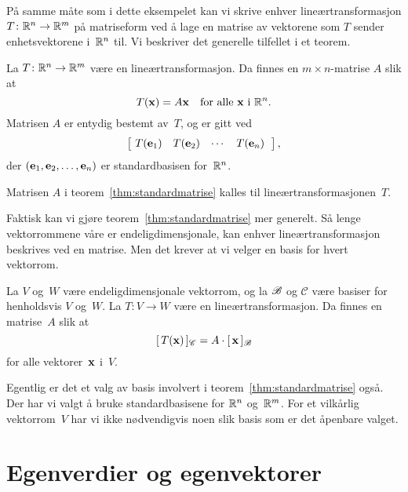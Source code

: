 På samme måte som i dette eksempelet kan vi skrive enhver
lineærtransformasjon $T \colon \mathbb{R}^n \to \mathbb{R}^m$ på matriseform ved å
lage en matrise av vektorene som $T$ sender enhetsvektorene i~$\mathbb{R}^n$
til.  Vi beskriver det generelle tilfellet i et teorem.

\begin{thm}
\label{thm:standardmatrise}
La $T \colon \mathbb{R}^n \to \mathbb{R}^m$ være en lineærtransformasjon.
Da finnes en $m \times n$-matrise $A$ slik at
\[
T(\mathbf{x}) = A\mathbf{x}
\quad\text{for alle $\mathbf{x}$ i $\mathbb{R}^n$.}
\]
Matrisen $A$ er entydig bestemt av~$T$, og er gitt ved
\[
\begin{bmatrix} \ T(\mathbf{e}_1) & T(\mathbf{e}_2) & \cdots & T(\mathbf{e}_n) \;\ \end{bmatrix},
\]
der $(\mathbf{e}_1, \mathbf{e}_2, \ldots, \mathbf{e}_n)$ er standardbasisen for~$\mathbb{R}^n$.
\end{thm}

\begin{defn}
Matrisen $A$ i teorem~\ref{thm:standardmatrise} kalles
 til lineærtransformasjonen~$T$.
\end{defn}


Faktisk kan vi gjøre teorem~\ref{thm:standardmatrise} mer generelt.
Så lenge vektorrommene våre er endeligdimensjonale, kan enhver
lineærtransformasjon beskrives ved en matrise.  Men det krever at vi
velger en basis for hvert vektorrom.

\begin{thm}
La $V$ og~$W$ være endeligdimensjonale vektorrom, og la $\mathscr{B}$ og
$\mathscr{C}$ være basiser for henholdsvis $V$ og~$W$.  La
$T \colon V \to W$ være en lineærtransformasjon.  Da finnes en
matrise~$A$ slik at
\[
[\,{T(\mathbf{x})}\,]_{\mathscr{C}} = A \cdot [\,{\mathbf{x}}\,]_{\mathscr{B}}
\]
for alle vektorer~$\mathbf{x}$ i~$V$.
\end{thm}

Egentlig er det et valg av basis involvert i
teorem~\ref{thm:standardmatrise} også.  Der har vi valgt å bruke
standardbasisene for $\mathbb{R}^n$ og~$\mathbb{R}^m$.  For et vilkårlig vektorrom~$V$
har vi ikke nødvendigvis noen slik basis som er det åpenbare valget.





\section*{Egenverdier og egenvektorer}

